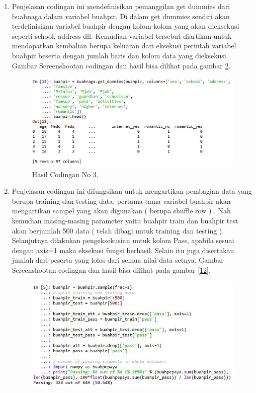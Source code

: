 \begin{enumerate}
\begin{figure}[ht]
		\caption{Hasil Codingan No 2.}
		\label{10}
\end{figure}
\item Penjelasan codingan ini mendefinisikan pemanggilan get dummies dari buahnaga dalam variabel buahpir. Di dalam get dummies sendiri akan terdefinisikan variabel buahpir dengan kolom-kolom yang akan dieksekusi seperti school, address dll. Kemudian variabel tersebut diartikan untuk mendapatkan kembalian berupa keluaran dari eksekusi perintah variabel buahpir beserta dengan jumlah baris dan kolom data yang dieksekusi.
\subitem Gambar Screenshootan codingan dan hasil bisa dilihat pada gambar \ref{11}.
\begin{figure}[ht]
		\centerline{\includegraphics[width=1\textwidth]{figures/huda/3_hari4.JPG}}
		\caption{Hasil Codingan No 3.}
		\label{11}
\end{figure}
\item Penjelasan codingan ini difungsikan untuk mengartikan pembagian data yang berupa training dan testing data. pertama-tama variabel buahpir akan mengartikan sampel yang akan digunakan ( berupa shuffle row ) . Nah kemudian masing-masing parameter yaitu buahpir train dan buahpir test akan berjumlah 500 data ( telah dibagi untuk training dan testing ). Selanjutnya dilakukan pengeksekusian untuk kolom Pass, apabila sesuai dengan axis=1 maka eksekusi fungsi berhasil. Selain itu juga disertakan jumlah dari peserta yang lolos dari semua nilai data setnya.  
\subitem Gambar Screenshootan codingan dan hasil bisa dilihat pada gambar \ref{12}.
\begin{figure}[ht]
		\centerline{\includegraphics[width=1\textwidth]{figures/huda/4_hari4.JPG}}

\end{figure}
\end{enumerate}
